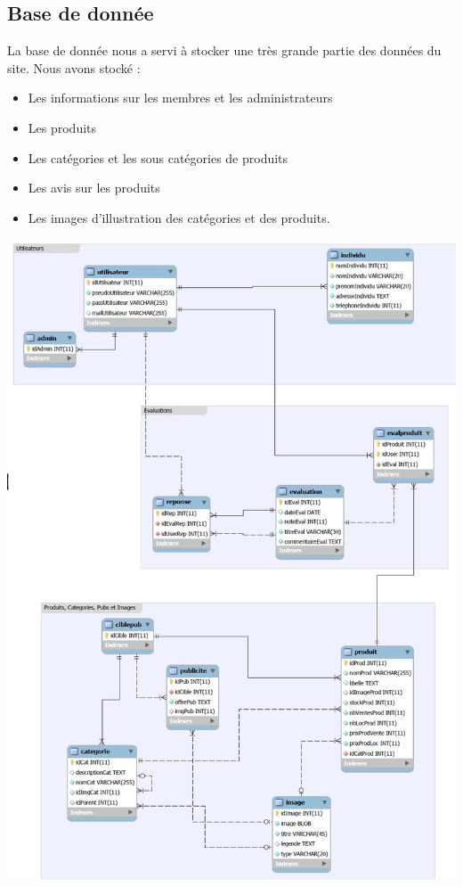 	\subsection{Base de donnée}
	La base de donnée nous a servi à stocker une très grande partie des données du site. Nous avons stocké :
	\begin{itemize}
	\item Les informations sur les membres et les administrateurs
	\item Les produits
	\item Les catégories et les sous catégories de produits
	\item Les avis sur les produits
	\item Les images d'illustration des catégories et des produits.
	\end{itemize}
\includegraphics[scale=0.5]{dbob.jpg}	